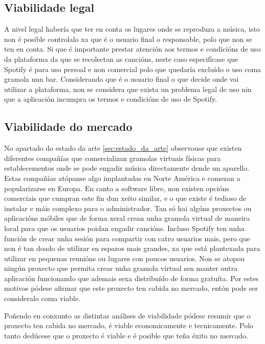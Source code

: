 \subsection{Viabilidade legal}
A nivel legal habería que ter en conta os lugares onde se reproduza a música, isto non é posible controlalo xa que é o usuario final o responsable, polo que non se ten en conta. Si que é importante prestar atención aos termos e condicións de uso da plataforma da que se recolectan as cancións, neste caso especifícase que Spotify é para uso persoal e non comercial polo que quedaría excluído o uso coma gramola nun bar. Considerando que é o usuario final o que decide onde vai utilizar a plataforma, non se considera que exista un problema legal de uso nin que a aplicación incumpra os termos e condicións de uso de Spotify.

\subsection{Viabilidade do mercado}
No apartado do estado da arte \ref{sec:estado_da_arte} observouse que existen diferentes compañías que comercializan gramolas virtuais físicas para establecementos onde se pode engadir música directamente dende un aparello. Estas compañías atópanse algo implantadas en Norte América e comezan a popularizarse en Europa. En canto a software libre, non existen opcións comerciais que cumpran este fin dun xeito similar, e o que existe é tedioso de instalar e máis complexo para o administrador. Tan só hai algúns proxectos ou aplicacións móbiles que de forma xeral crean unha gramola virtual de maneira local para que os usuarios poidan engadir cancións. Incluso Spotify ten unha función de crear unha sesión para compartir con catro usuarios mais, pero que non é tan doado de utilizar en espazos mais grandes, xa que está plantexada para utilizar en pequenas reunións ou lugares con poucos usuarios. Non se atopou ningún proxecto que permita crear unha gramola virtual sen manter outra aplicación funcionando que ademais sexa distribuído de forma gratuíta. Por estes motivos pódese afirmar que este proxecto ten cabida no mercado, entón pode ser consideralo coma viable.\bigbreak

Poñendo en conxunto as distintas análises de viabilidade pódese resumir que o proxecto ten cabida no mercado, é viable economicamente e tecnicamente. Polo tanto dedúcese que o proxecto é viable e é posible que teña éxito no mercado.
